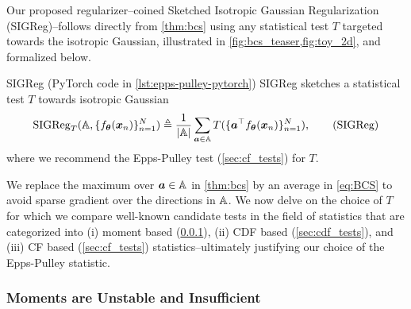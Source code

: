Our proposed regularizer--coined Sketched Isotropic Gaussian Regularization (SIGReg)--follows directly from \cref{thm:bcs} using any statistical test $T$ targeted towards the isotropic Gaussian, illustrated in \cref{fig:bcs_teaser,fig:toy_2d}, and formalized below.



\begin{definition}[label={def:bcs}]{SIGReg (PyTorch code in \cref{lst:epps-pulley-pytorch})}{}
SIGReg sketches a statistical test $T$ towards isotropic Gaussian
\begin{multline}
    {\rm SIGReg}_{T}({\mathbb{A}},\{f_{{\bm{\theta}}}({\bm{x}}_n)\}_{n=1}^{N})\triangleq\frac{1}{|{\mathbb{A}}|}\sum_{{\bm{a}}\in{\mathbb{A}}}T(\{{\bm{a}}^\top f_{{\bm{\theta}}}({\bm{x}}_n)\}_{n=1}^{N}),\tag{SIGReg}\label{eq:BCS}
\end{multline}
where we recommend the Epps-Pulley test (\cref{sec:cf_tests}) for $T$.
\end{definition}

We replace the maximum over ${\bm{a}}\in{\mathbb{A}}$ in \cref{thm:bcs} by an average in \eqref{eq:BCS} to avoid sparse gradient over the directions in ${\mathbb{A}}$. We now delve on the choice of $T$ for which we compare well-known candidate tests in the field of statistics that are categorized into (i) moment based (\cref{sec:moment_tests}), (ii) CDF based (\cref{sec:cdf_tests}), and (iii) CF based (\cref{sec:cf_tests}) statistics--ultimately justifying our choice of the Epps-Pulley statistic.




\subsubsection{Moments are Unstable and Insufficient}
\label{sec:moment_tests}

